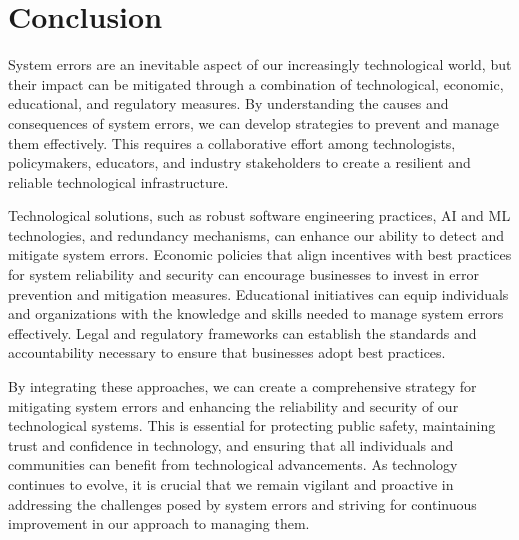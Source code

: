 \documentclass[10pt, conference, letterpaper]{IEEEtran}
\begin{document}
\section{Conclusion}
System errors are an inevitable aspect of our increasingly technological world, but their impact can be mitigated through a combination of technological, economic, educational, and regulatory measures. By understanding the causes and consequences of system errors, we can develop strategies to prevent and manage them effectively. This requires a collaborative effort among technologists, policymakers, educators, and industry stakeholders to create a resilient and reliable technological infrastructure.

Technological solutions, such as robust software engineering practices, AI and ML technologies, and redundancy mechanisms, can enhance our ability to detect and mitigate system errors. Economic policies that align incentives with best practices for system reliability and security can encourage businesses to invest in error prevention and mitigation measures. Educational initiatives can equip individuals and organizations with the knowledge and skills needed to manage system errors effectively. Legal and regulatory frameworks can establish the standards and accountability necessary to ensure that businesses adopt best practices.

By integrating these approaches, we can create a comprehensive strategy for mitigating system errors and enhancing the reliability and security of our technological systems. This is essential for protecting public safety, maintaining trust and confidence in technology, and ensuring that all individuals and communities can benefit from technological advancements. As technology continues to evolve, it is crucial that we remain vigilant and proactive in addressing the challenges posed by system errors and striving for continuous improvement in our approach to managing them.
\end{document}
